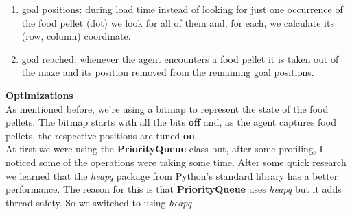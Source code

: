 \documentclass[11pt]{article}
\begin{document}
\begin{enumerate}
\item goal positions: during load time instead of looking for just one occurrence of the food pellet (dot) we look for all of them and, for each, we calculate its (row, column) coordinate.

\item goal reached: whenever the agent encounters a food pellet it is taken out of the maze and its position removed from the remaining goal positions.

\end{enumerate}

\textbf{Optimizations}\\
As mentioned before, we're using a bitmap to represent the state of the food pellets. The bitmap starts with all the bits \textbf{off} and, as the agent captures food pellets, the respective positions are tuned \textbf{on}. \\

At first we were using the \textbf{PriorityQueue} class but, after some profiling, I noticed some of the operations were taking some time. After some quick research we learned that the \textit{heapq} package from Python's standard library has a better performance. The reason for this is that \textbf{PriorityQueue} uses \textit{heapq} but it adds thread safety. So we switched to using \textit{heapq}.\\
\end{document}
